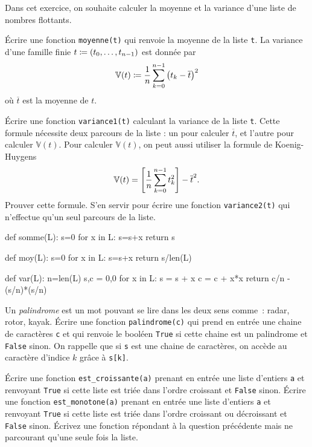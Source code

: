 \documentclass{magnoliaold}
\begin{document}
 Dans cet exercice, on souhaite calculer la moyenne et la variance d'une liste
  de nombres flottants.
  \begin{questions}
  \question Écrire une fonction \verb!moyenne(t)! qui renvoie la
    moyenne de la liste \verb!t!.
  \question La variance d'une famille finie $t\coloneqq (t_0,\dots,t_{n-1})$ est donnée par
      \[\mathbb{V}(t)\coloneqq\frac{1}{n}\sum_{k=0}^{n-1} \left(t_k-\overline{t}\right)^2\] 
  où $\overline{t}$ est la moyenne de $t$.
  \begin{questions}
  \question Écrire une fonction \verb!variance1(t)! calculant
    la variance de la liste \verb!t!.
  \enonce Cette formule nécessite deux parcours de la liste : un pour calculer $\overline{t}$, et l'autre pour calculer $\mathbb{V}(t)$. Pour calculer $\mathbb{V}(t)$, on peut aussi utiliser la formule de Koenig-Huygens
  \[\mathbb{V}(t)=\left[\frac{1}{n}\sum_{k=0}^{n-1} t_k^2\right] -\overline{t}^2.\]
  \question Prouver cette formule.
  \question S'en servir pour écrire une fonction \verb!variance2(t)! qui n'effectue qu'un seul parcours de la liste.
  \end{questions}
  \end{questions}
  \begin{sol}
  \begin{pythoncode}
  def somme(L):
      s=0
      for x in L:
          s=s+x
      return s
  \end{pythoncode}
  \begin{pythoncode}
  def moy(L):
      s=0
      for x in L:
          s=s+x
      return s/len(L)
  \end{pythoncode}
  \begin{pythoncode}
  def var(L):
      n=len(L)
      s,c = 0,0
      for x in L:
          s = s + x
          c = c + x*x
      return c/n - (s/n)*(s/n)
  \end{pythoncode}
  \end{sol}

Un \emph{palindrome} est un mot pouvant se lire dans les deux sens comme~: radar, rotor, kayak.
Écrire une fonction \verb_palindrome(c)_ qui prend en entrée une chaine de caractères \verb_c_ et qui renvoie le booléen \verb_True_ si cette chaine est un palindrome et \verb_False_ sinon. On rappelle que si \verb_s_ est une chaine de
caractères, on accède au caractère d'indice $k$ grâce à \verb_s[k]_.

\begin{questions}
\question Écrire une fonction \verb!est_croissante(a)! prenant en entrée une liste d'entiers \verb!a! et renvoyant
  \verb!True! si cette liste est triée dans l'ordre croissant et \verb_False_ sinon.
\question Écrire une fonction \verb!est_monotone(a)! prenant en entrée une liste d'entiers \verb!a! et renvoyant
  \verb!True! si cette liste est triée dans l'ordre croissant ou décroissant et \verb_False_ sinon.
\question Écrivez une fonction répondant à la question précédente mais ne parcourant qu'une seule fois la liste.
\end{questions}
\end{document}
